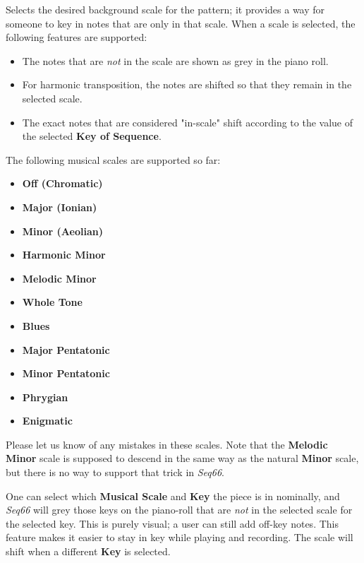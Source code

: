    Selects the desired background scale for the pattern; it provides a way for
   someone to key in notes that are only in that scale.
   When a scale is selected, the following features are supported:

   \begin{itemize}
      \item The notes that are \textsl{not}
         in the scale are shown as grey in the piano roll.
      \item For harmonic transposition, the notes are shifted
         so that they remain in the selected scale.
      \item The exact notes that are considered "in-scale" shift according
         to the value of the selected \textbf{Key of Sequence}.
   \end{itemize}

   The following musical scales are supported so far:

   \begin{itemize}
      \item \textbf{Off (Chromatic)}
      \item \textbf{Major (Ionian)}
      \item \textbf{Minor (Aeolian)}
      \item \textbf{Harmonic Minor}
      \item \textbf{Melodic Minor}
      \item \textbf{Whole Tone}
      \item \textbf{Blues}
      \item \textbf{Major Pentatonic}
      \item \textbf{Minor Pentatonic}
      \item \textbf{Phrygian}
      \item \textbf{Enigmatic}
   \end{itemize}

   Please let us know of any mistakes in these scales.
   Note that the \textbf{Melodic Minor} scale is supposed to
   descend in the same way as the natural \textbf{Minor} scale, but
   there is no way to support that trick in \textsl{Seq66}.

   One can select which \textbf{Musical Scale} and
   \textbf{Key} the piece is in nominally,
   and \textsl{Seq66} will grey those keys on the piano-roll that
   are \textsl{not} in the selected scale for the selected key.
   This is purely visual; a user can still add off-key notes.
   This feature makes it easier to stay in key while playing and recording.
   The scale will shift when a different \textbf{Key} is selected.

